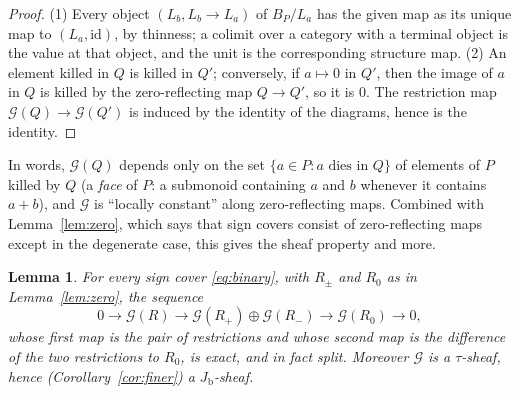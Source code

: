 \documentclass[12pt]{article}
\newcommand{\Jb}{J_{\mathrm b}}
\newcommand{\G}{\mathcal G}
\newtheorem{lemma}[theorem]{Lemma}
\theoremstyle{definition}
\theoremstyle{remark}
\begin{document}
\begin{proof}
(1) Every object \((L_b,L_b\to L_a)\) of \(B_P/L_a\) has the given map as
its unique map to \((L_a,\mathrm{id})\), by thinness; a colimit over a
category with a terminal object is the value at that object, and the unit
is the corresponding structure map.  (2) An element killed in \(Q\) is
killed in \(Q'\); conversely, if \(a\mapsto0\) in \(Q'\), then the image of
\(a\) in \(Q\) is killed by the zero-reflecting map \(Q\to Q'\), so it is
\(0\).  The restriction map \(\G(Q)\to\G(Q')\) is induced by the identity of
the diagrams, hence is the identity.
\end{proof}

In words, \(\G(Q)\) depends only on the set \(\{a\in P:a\text{ dies in }Q\}\)
of elements of \(P\) killed by \(Q\) (a \emph{face} of \(P\): a submonoid
containing \(a\) and \(b\) whenever it contains \(a+b\)), and \(\G\) is
``locally constant'' along zero-reflecting maps.  Combined with Lemma~\ref{lem:zero}, which says that
sign covers consist of zero-reflecting maps except in the degenerate case,
this gives the sheaf property and more.

\begin{lemma}\label{lem:mvsections}
For every sign cover \eqref{eq:binary}, with \(R_\pm\) and \(R_0\) as in
Lemma~\ref{lem:zero}, the sequence
\begin{equation}
 0\longrightarrow\G(R)
   \longrightarrow\G(R_+)\oplus\G(R_-)
   \longrightarrow\G(R_0)\longrightarrow0,
                         \label{eq:mvsections}
\end{equation}
whose first map is the pair of restrictions and whose second map is the
difference of the two restrictions to \(R_0\), is exact, and in fact split.
Moreover \(\G\) is a
\(\tau\)-sheaf, hence (Corollary~\ref{cor:finer}) a \(\Jb\)-sheaf.
\end{lemma}
\end{document}

